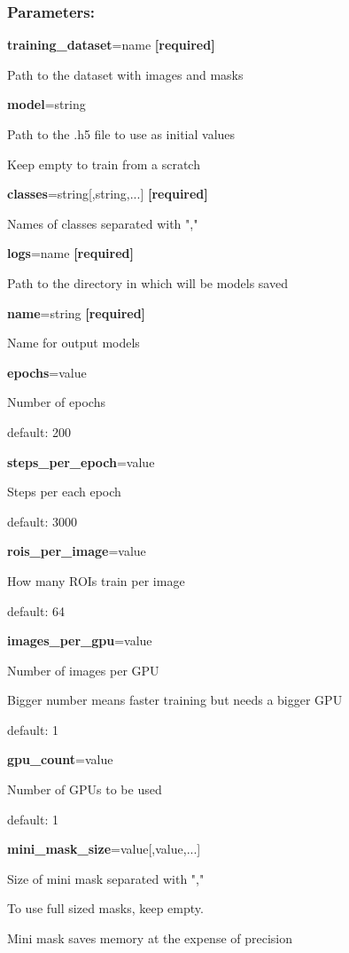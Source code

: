 \subsubsection*{Parameters:}

\begin{flushleft}
\textbf{training\_dataset}=name \textbf{[required]}

\tab Path to the dataset with images and masks

\textbf{model}=string

\tab Path to the .h5 file to use as initial values

\tab Keep empty to train from a scratch

\textbf{classes}=string[,string,...] \textbf{[required]}
           
\tab Names of classes separated with ","

\textbf{logs}=name \textbf{[required]}

\tab Path to the directory in which will be models saved

\textbf{name}=string \textbf{[required]}

\tab Name for output models

\textbf{epochs}=value

\tab Number of epochs

\tab default: 200

\textbf{steps\_per\_epoch}=value

\tab Steps per each epoch

\tab default: 3000

\textbf{rois\_per\_image}=value

\tab How many ROIs train per image

\tab default: 64

\textbf{images\_per\_gpu}=value

\tab Number of images per GPU

\tab Bigger number means faster training but needs a bigger GPU

\tab default: 1

\textbf{gpu\_count}=value

\tab Number of GPUs to be used

\tab default: 1

\textbf{mini\_mask\_size}=value[,value,...]

\tab Size of mini mask separated with ","

\tab To use full sized masks, keep empty.

\tab Mini mask saves memory at the expense of precision


\end{flushleft}

